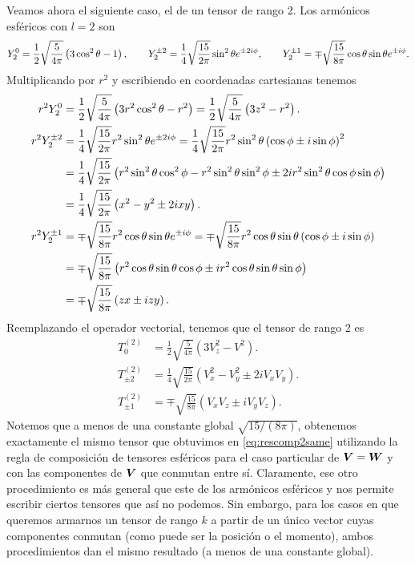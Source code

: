 \documentclass[10pt, a4paper]{article}
\numberwithin{equation}{subsection}
\begin{document}
Veamos ahora el siguiente caso, el de un tensor de rango 2. Los armónicos
esféricos con $l=2$ son
\begin{equation}
  \SphericalHarmonic{2}{0} = \frac{1}{2}\sqrt{\frac{5}{4\pi}}
    \left(3\cos^2\theta - 1\right), \qquad
  \SphericalHarmonic{2}{\pm2} = \frac{1}{4}\sqrt{\frac{15}{2\pi}}\sin^2\theta
    e^{\pm2i\phi}, \qquad
  \SphericalHarmonic{2}{\pm1} = \mp\sqrt{\frac{15}{8\pi}}\cos\theta\sin\theta
    e^{\pm i\phi}.
\end{equation}
Multiplicando por $r^2$ y escribiendo en coordenadas cartesianas tenemos
\begin{align}
  r^2\SphericalHarmonic{2}{0} &=
    \frac{1}{2}\sqrt{\frac{5}{4\pi}} \left(3r^2\cos^2\theta - r^2\right) =
    \frac{1}{2}\sqrt{\frac{5}{4\pi}} \left(3z^2 - r^2\right). \\
  r^2\SphericalHarmonic{2}{\pm2} &=
    \frac{1}{4} \sqrt{\frac{15}{2\pi}}r^2\sin^2\theta e^{\pm2i\phi} =
    \frac{1}{4} \sqrt{\frac{15}{2\pi}}r^2\sin^2\theta\left(\cos\phi \pm
      i\sin\phi\right)^2 \nonumber \\
  &= \frac{1}{4} \sqrt{\frac{15}{2\pi}}\left(r^2\sin^2\theta\cos^2\phi -
    r^2\sin^2\theta\sin^2\phi \pm 2i r^2\sin^2\theta\cos\phi\sin\phi\right)
    \nonumber \\
  &= \frac{1}{4} \sqrt{\frac{15}{2\pi}}\left(x^2 - y^2 \pm 2ixy\right). \\
  r^2\SphericalHarmonic{2}{\pm1} &=
    \mp\sqrt{\frac{15}{8\pi}}r^2\cos\theta\sin\theta e^{\pm i\phi} =
    \mp\sqrt{\frac{15}{8\pi}}r^2\cos\theta\sin\theta\left(\cos\phi \pm
      i\sin\phi\right) \nonumber \\
  &= \mp\sqrt{\frac{15}{8\pi}}\left(r^2\cos\theta\sin\theta\cos\phi \pm
      ir^2\cos\theta\sin\theta\sin\phi\right) \nonumber \\
  &= \mp\sqrt{\frac{15}{8\pi}}\left(zx \pm izy\right).
\end{align}
Reemplazando el operador vectorial, tenemos que el tensor de rango 2 es
\begin{align} \label{eq:tensorspharmonic2}
  T^{(2)}_0 &= \frac{1}{2}\sqrt{\frac{5}{4\pi}}\left(3V_z^2 - V^2\right). \\
  T^{(2)}_{\pm2} &= \frac{1}{4}\sqrt{\frac{15}{2\pi}}\left(V_x^2 - V_y^2
    \pm2iV_xV_y\right). \\
  T^{(2)}_{\pm1} &= \mp\sqrt{\frac{15}{8\pi}}\left(V_xV_z \pm iV_yV_z \right).
\end{align}
Notemos que a menos de una constante global $\sqrt{15/(8\pi)}$, obtenemos
exactamente el mismo tensor que obtuvimos en \eqref{eq:rescomp2same} utilizando
la regla de composición de tensores esféricos para el caso particular de
$\vb*{V} = \vb*{W}$ y con las componentes de $\vb*{V}$ que conmutan entre
sí. Claramente, ese otro procedimiento es más general que este de los armónicos
esféricos y nos permite escribir ciertos tensores que así no podemos. Sin
embargo, para los casos en que queremos armarnos un tensor de rango $k$ a
partir de un único vector cuyas componentes conmutan (como puede ser la
posición o el momento), ambos procedimientos dan el mismo resultado (a menos de
una constante global).
\end{document}
